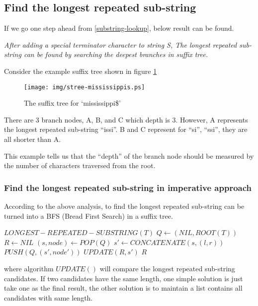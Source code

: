 \documentclass{article}
\begin{document}
\subsection{Find the longest repeated sub-string}

If we go one step ahead from \ref{substring-lookup}, below result can
be found.

{\em After adding a special terminator character to string S, The 
longest repeated sub-string can be found by searching the 
deepest branches in suffix tree.}

Consider the example suffix tree shown in figure \ref{fig:stree-mississippis}

\begin{figure}[htbp]
   \begin{center}
      \texttt{[image: img/stree-mississippis.ps]}
      \caption{The suffix tree for `mississippi\$'} \label{fig:stree-mississippis}
   \end{center}
\end{figure}

There are 3 branch nodes, A, B, and C which depth is 3. However, A represents
the longest repeated sub-string ``issi''. B and C represent for ``si'', ``ssi'',
they are all shorter than A. 

This example tells us that the ``depth'' of the branch node should be measured
by the number of characters traversed from the root.

\subsubsection{Find the longest repeated sub-string in imperative approach}
According to the above analysis, to find the longest repeated sub-string
can be turned into a BFS (Bread First Search) in a suffix tree.

\begin{algorithmic}
\STATE $LONGEST-REPEATED-SUBSTRING(T)$
  \STATE $Q \leftarrow (NIL, ROOT(T))$
  \STATE $R \leftarrow NIL$
    \STATE $(s, node) \leftarrow POP(Q)$
        \STATE $s' \leftarrow CONCATENATE(s, (l, r))$
        \STATE $PUSH(Q, (s', node'))$
        \STATE $UPDATE(R, s')$
      \ENDIF
    \ENDFOR
  \ENDWHILE
  \RETURN $R$
\end{algorithmic}

where algorithm $UPDATE()$ will compare the longest repeated sub-string
candidates. If two candidates have the same length, one simple solution
is just take one as the final result, the other solution is to maintain
a list contains all candidates with same length.
\end{document}

